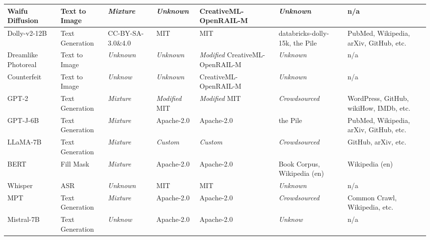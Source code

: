 \begin{table}[h]
\begin{tabular}{|p{2.1cm}|p{1.6cm}|p{2cm}|p{2.75cm}|p{3cm}|p{1.7cm}|p{2cm}|}
      Waifu Diffusion & Text to Image & \textit{Mixture} & \textit{Unknown} & CreativeML-OpenRAIL-M & \textit{Unknown} & n/a \\ \hline

      Dolly-v2-12B & Text Generation & CC-BY-SA-3.0\&4.0 & MIT & MIT & databricks-dolly\newline-15k, the Pile & PubMed,  Wikipedia, \newline arXiv, GitHub, etc. \\ \hline

      Dreamlike Photoreal & Text to Image & \textit{Unknown} & \textit{Unknown} & \textit{Modified} CreativeML-\newline OpenRAIL-M & \textit{Unknown} & n/a \\ \hline

      Counterfeit & Text to Image & \textit{Unknow} & \textit{Unknown} & CreativeML-OpenRAIL-M & \textit{Unknown} & n/a \\ \hline

      GPT-2 & Text Generation & \textit{Mixture} & \textit{Modified} MIT & \textit{Modified} MIT & \textit{Crowdsourced} & WordPress, GitHub, \newline wikiHow, IMDb, etc. \\ \hline

      GPT-J-6B & Text Generation & \textit{Mixture} & Apache-2.0 & Apache-2.0 & the Pile & PubMed,  Wikipedia, \newline arXiv, GitHub, etc. \\ \hline

      LLaMA-7B & Text Generation & \textit{Mixture} & \textit{Custom} & \textit{Custom} & \textit{Crowdsourced} & GitHub, arXiv, etc. \\ \hline

      BERT & Fill Mask & \textit{Mixture} & Apache-2.0 & Apache-2.0 & Book Corpus, \newline Wikipedia (en) & Wikipedia (en) \\ \hline

      Whisper & ASR & \textit{Unknown} & MIT & MIT & \textit{Unknown} & n/a \\ \hline

      MPT & Text Generation & \textit{Mixture} & Apache-2.0 & Apache-2.0 & \textit{Crowdsourced} & Common Crawl, \newline Wikipedia, etc. \\ \hline

      Mistral-7B & Text Generation & \textit{Unknow} & Apache-2.0 & Apache-2.0 & \textit{Unknow} & n/a \\ \hline
  

  \end{tabular}
\end{table}